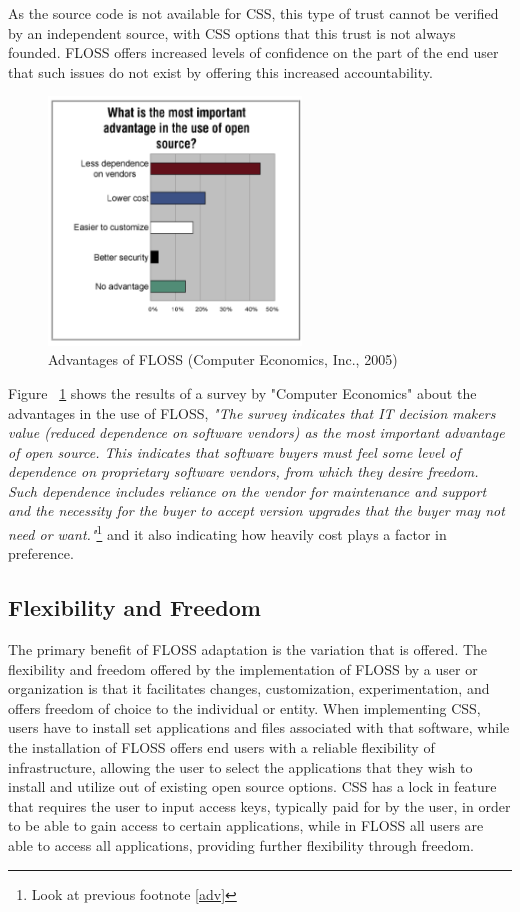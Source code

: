    As the source code is not available for CSS, this type of trust cannot be verified by an independent source, with CSS options that this trust is not always founded. FLOSS offers increased levels of confidence on the part of the end user that such issues do not exist by offering this increased accountability.
 \begin{figure}[H]
 	\centering
 	   \includegraphics[width=0.6\textwidth]{img/OSSadv.png}
 	  \caption[Advantages of FLOSS]{Advantages of FLOSS (Computer Economics, Inc., 2005) \protect\footnotemark }  
 	  \label{fig:OSSsdv}
 	 	\end{figure}
 Figure ~\ref{fig:OSSsdv} shows the results of a survey  by "Computer Economics" about the advantages in the use of FLOSS, \textit{"The survey indicates that IT decision makers value (reduced dependence on software vendors) as the most important advantage of open source.  This indicates that software buyers must feel some level of dependence on proprietary software vendors, from which they desire freedom.  Such dependence includes reliance on the vendor for maintenance and support and the necessity for the buyer to accept version upgrades that the buyer may not need or want."}\footnote{Look at previous footnote \ref{adv}} and it also indicating how heavily cost plays a factor in preference.

 \subsection {Flexibility and Freedom } 
  The primary benefit of FLOSS adaptation is the variation that is offered. The flexibility and freedom offered by the implementation of FLOSS by a user or organization is that it facilitates changes, customization, experimentation, and offers freedom of choice to the individual or entity. When implementing CSS, users have to install set applications and files associated with that software, while the installation of FLOSS offers end users with a reliable flexibility of infrastructure, allowing the user to select the applications that they wish to install and utilize out of existing open source options. CSS has a lock in feature that requires the user to input access keys, typically paid for by the user, in order to be able to gain access to certain applications, while in FLOSS all users are able to access all applications, providing further flexibility through freedom. 

